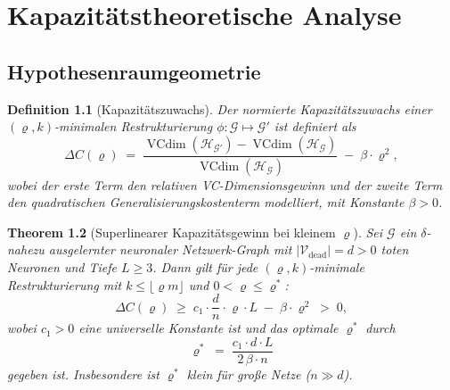 \documentclass[12pt, a4paper, openany]{report}
\newtheorem{theorem}{Theorem}[chapter]
\newtheorem{definition}[theorem]{Definition}
\newcommand{\calG}{\mathcal{G}}
\newcommand{\calH}{\mathcal{H}}
\newcommand{\calV}{\mathcal{V}}
\DeclareMathOperator{\VC}{VCdim}
\begin{document}
\chapter{Kapazitätstheoretische Analyse}
\label{sec:capacity}

\section{Hypothesenraumgeometrie}

\begin{definition}[Kapazitätszuwachs]
\label{def:capacity}
Der \emph{normierte Kapazitätszuwachs} einer $(\varrho, k)$-minimalen
Restrukturierung $\phi : \calG \mapsto \calG'$ ist definiert als
\begin{equation}
  \label{eq:deltaC}
  \Delta C(\varrho) \;=\;
  \frac{\VC(\calH_{\calG'}) - \VC(\calH_{\calG})}{\VC(\calH_{\calG})}
  \;-\; \beta \cdot \varrho^2,
\end{equation}
wobei der erste Term den relativen VC-Dimensionsgewinn und der zweite Term
den quadratischen Generalisierungskostenterm modelliert, mit Konstante
$\beta > 0$.
\end{definition}

\begin{theorem}[Superlinearer Kapazitätsgewinn bei kleinem $\varrho$]
\label{thm:main}
Sei $\calG$ ein $\delta$-nahezu ausgelernter neuronaler Netzwerk-Graph mit
$|\calV_{\mathrm{dead}}| = d > 0$ toten Neuronen und Tiefe $L \geq 3$.
Dann gilt für jede $(\varrho, k)$-minimale Restrukturierung mit
$k \leq \lfloor\varrho m\rfloor$ und $0 < \varrho \leq \varrho^*$:
\begin{equation}
  \label{eq:main_thm}
  \Delta C(\varrho)
  \;\geq\;
  c_1 \cdot \frac{d}{n} \cdot \varrho \cdot L
  \;-\; \beta \cdot \varrho^2
  \;>\; 0,
\end{equation}
wobei $c_1 > 0$ eine universelle Konstante ist und das optimale
$\varrho^*$ durch
\begin{equation}
  \label{eq:rho_opt}
  \varrho^*
  \;=\;
  \frac{c_1 \cdot d \cdot L}{2\,\beta \cdot n}
\end{equation}
gegeben ist.  Insbesondere ist $\varrho^*$ \emph{klein} für große Netze ($n \gg d$).
\end{theorem}
\end{document}
